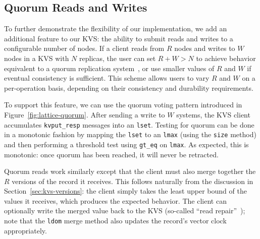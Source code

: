 \subsection{Quorum Reads and Writes}
To further demonstrate the flexibility of our implementation, we add an
additional feature to our KVS: the ability to submit reads and writes to a
configurable number of nodes. If a client reads from $R$ nodes and writes to $W$
nodes in a KVS with $N$ replicas, the user can set $R + W > N$ to achieve
behavior equivalent to a quorum replication system~\cite{Gifford1979}, or use
smaller values of $R$ and $W$ if eventual consistency is sufficient. This scheme
allows users to vary $R$ and $W$ on a per-operation basis, depending on their
consistency and durability requirements.

To support this feature, we can use the \lang quorum voting pattern
introduced in Figure~\ref{fig:lattice-quorum}. After sending a write to $W$
systems, the KVS client accumulates \texttt{kvput\_resp} messages into an
\texttt{lset}. Testing for quorum can be done in a monotonic fashion by mapping
the \texttt{lset} to an \texttt{lmax} (using the \texttt{size} method) and then
performing a threshold test using \texttt{gt\_eq} on \texttt{lmax}. As expected,
this is monotonic: once quorum has been reached, it will never be retracted.

Quorum reads work similarly except that the client must also merge together the
$R$ versions of the record it receives. This follows naturally from the
discussion in Section~\ref{sec:kvs-versions}: the client simply takes the least
upper bound of the values it receives, which produces the expected behavior. The
client can optionally write the merged value back to the KVS (so-called ``read
repair''~\cite{DeCandia2007}); note that the \texttt{ldom} merge method also
updates the record's vector clock appropriately.
